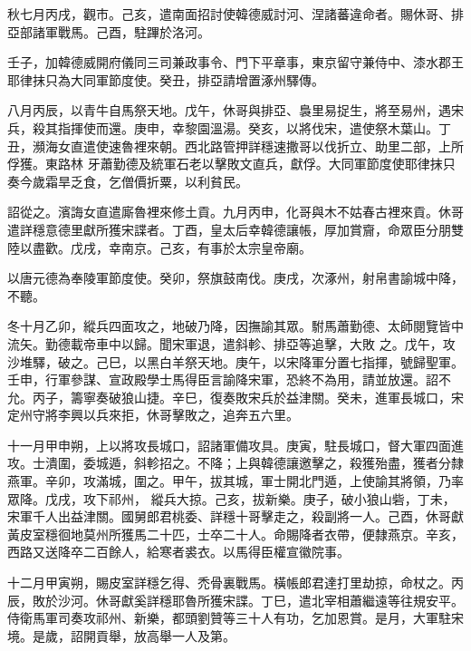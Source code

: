 \begin{pinyinscope}
 秋七月丙戌，觀市。己亥，遣南面招討使韓德威討河、涅諸蕃違命者。賜休哥、排亞部諸軍戰馬。己酉，駐蹕於洛河。



 壬子，加韓德威開府儀同三司兼政事令、門下平章事，東京留守兼侍中、漆水郡王耶律抹只為大同軍節度使。癸丑，排亞請增置涿州驛傳。



 八月丙辰，以青牛自馬祭天地。戊午，休哥與排亞、裊里易捉生，將至易州，遇宋兵，殺其指揮使而還。庚申，幸黎園溫湯。癸亥，以將伐宋，遣使祭木葉山。丁丑，瀕海女直遣使速魯裡來朝。西北路管押詳穩速撒哥以伐折立、助里二部，上所俘獲。東路林
 牙蕭勤德及統軍石老以擊敗文直兵，獻俘。大同軍節度使耶律抹只奏今歲霜旱乏食，乞僧價折粟，以利貧民。



 詔從之。濱誨女直遣廝魯裡來修土貢。九月丙申，化哥與木不姑春古裡來貢。休哥遣詳穩意德里獻所獲宋諜者。丁酉，皇太后幸韓德讓帳，厚加賞齎，命眾臣分朋雙陸以盡歡。戊戌，幸南京。己亥，有事於太宗皇帝廟。



 以唐元德為奉陵軍節度使。癸卯，祭旗鼓南伐。庚戌，次涿州，射帛書諭城中降，不聽。



 冬十月乙卯，縱兵四面攻之，地破乃降，因撫諭其眾。駙馬蕭勤德、太師閱覽皆中流矢。勤德載帝車中以歸。聞宋軍退，遣斜軫、排亞等追擊，大敗
 之。戊午，攻沙堆驛，破之。己巳，以黑白羊祭天地。庚午，以宋降軍分置七指揮，號歸聖軍。壬申，行軍參謀、宣政殿學士馬得臣言諭降宋軍，恐終不為用，請並放還。詔不允。丙子，籌寧奏破狼山捷。辛巳，復奏敗宋兵於益津關。癸未，進軍長城口，宋定州守將李興以兵來拒，休哥擊敗之，追奔五六里。



 十一月甲申朔，上以將攻長城口，詔諸軍備攻具。庚寅，駐長城口，督大軍四面進攻。士潰圍，委城遁，斜軫招之。不降；上與韓德讓邀擊之，殺獲殆盡，獲者分隸燕軍。辛卯，攻滿城，圍之。甲午，拔其城，軍士開北門遁，上使諭其將領，乃率眾降。戊戌，攻下祁州，
 縱兵大掠。己亥，拔新樂。庚子，破小狼山砦，丁未，宋軍千人出益津關。國舅郎君桃委、詳穩十哥擊走之，殺副將一人。己酉，休哥獻黃皮室穩徊地莫州所獲馬二十匹，士卒二十人。命賜降者衣帶，便隸燕京。辛亥，西路又送降卒二百餘人，給寒者裘衣。以馬得臣權宣徽院事。



 十二月甲寅朔，賜皮室詳穩乞得、禿骨裏戰馬。橫帳郎君達打里劫掠，命杖之。丙辰，敗於沙河。休哥獻奚詳穩耶魯所獲宋諜。丁巳，遣北宰相蕭繼遠等往規安平。侍衛馬軍司奏攻祁州、新樂，都頭劉贊等三十人有功，乞加恩賞。是月，大軍駐宋境。是歲，詔開貢舉，放高舉一人及第。




\end{pinyinscope}
